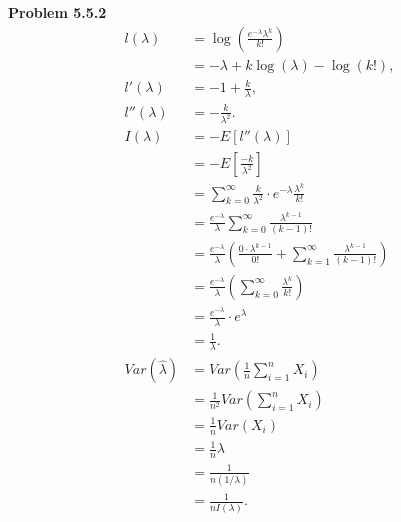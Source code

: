 \documentclass{article}
\begin{document}
\textbf{Problem 5.5.2}
\begin{align}
    l(\lambda) & = \log(\frac{e^{-\lambda}\lambda^k}{k!}) \nonumber \\
    & = -\lambda + k\log(\lambda) - \log(k!), \nonumber \\
    l'(\lambda) & = -1 + \frac{k}{\lambda}, \nonumber \\
    l''(\lambda) & = -\frac{k}{\lambda^2}. \nonumber \\
    I(\lambda) & = -E[l''(\lambda)] \nonumber \\
    & = -E[\frac{-k}{\lambda^2}] \nonumber \\
    & =  \sum_{k=0}^{\infty} \frac{k}{\lambda^2}\cdot e^{-\lambda}\frac{\lambda^k}{k!} \nonumber \\
    & = \frac{e^{-\lambda}}{\lambda}\sum_{k=0}^{\infty} \frac{\lambda^{k-1}}{(k-1)!} \nonumber \\
    & = \frac{e^{-\lambda}}{\lambda} \left(\frac{0\cdot \lambda^{k-1}}{0!} + \sum_{k=1}^{\infty}\frac{\lambda^{k-1}}{(k-1)!}\right) \nonumber \\
    & = \frac{e^{-\lambda}}{\lambda} \left(\sum_{k=0}^{\infty}\frac{\lambda^{k}}{k!}\right) \nonumber \\
    & = \frac{e^{-\lambda}}{\lambda} \cdot e^{\lambda} \nonumber \\
    & = \frac{1}{\lambda}. \nonumber \\
    Var(\hat{\lambda}) & = Var\left(\frac{1}{n}\sum_{i=1}^{n}X_i\right) \nonumber \\
    & = \frac{1}{n^2}Var\left(\sum_{i=1}^{n}X_i\right) \nonumber \\
    & = \frac{1}{n}Var(X_i) \nonumber \\
    & = \frac{1}{n}\lambda \nonumber \\
    & = \frac{1}{n(1/\lambda)} \nonumber \\
    & = \frac{1}{nI(\lambda)}. \nonumber
\end{align}
\bigbreak
\end{document}
